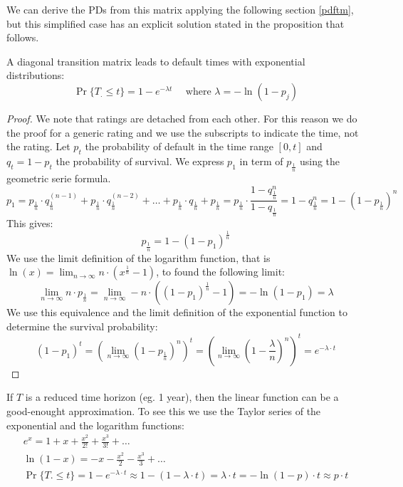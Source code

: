 \documentclass[11pt,fleqn]{book} %
\begin{document}
We can derive the PDs from this matrix applying the following 
section \ref{pdftm}, but this simplified case has an explicit
solution stated in the proposition that follows.

\begin{proposition}
	A diagonal transition matrix leads to default times with exponential
	distributions:
	\begin{displaymath}
		\Pr\{T_. \le t\} = 1 - e^{-\lambda t} 
		\quad \text{ where } \lambda = -\ln(1-p_j)
	\end{displaymath}
\end{proposition}
\begin{proof}
	We note that ratings are detached from each other. 
	For this reason we do the proof for a generic rating and we
	use the subscripts to indicate the time, not the rating.
	Let $p_t$ the probability of default in the time range $[0,t]$ and
	$q_t=1-p_t$ the probability of survival. We express $p_1$ in term
	of $p_{\frac{1}{n}}$ using the geometric serie formula.
	\begin{displaymath}
		p_1 = p_{\frac{1}{n}} \cdot q_{\frac{1}{n}}^{(n-1)} + 
			p_{\frac{1}{n}} \cdot q_{\frac{1}{n}}^{(n-2)} + \dots + 
			p_{\frac{1}{n}} \cdot q_{\frac{1}{n}} + 
			p_{\frac{1}{n}}
		= p_{\frac{1}{n}} \cdot \frac{1-q_{\frac{1}{n}}^n}{1-q_{\frac{1}{n}}}
		= 1 - q_{\frac{1}{n}}^n
		= 1- (1-p_{\frac{1}{n}})^n
	\end{displaymath}
	This gives:
	\begin{displaymath}
		p_{\frac{1}{n}} = 1-(1-p_1)^{\frac{1}{n}}
	\end{displaymath}
	We use the limit definition of the logarithm function, that is 
	$\ln(x)=\lim_{n \to \infty} n \cdot(x^{\frac{1}{n}}-1)$, to
	found the following limit:
	\begin{displaymath}
		\lim_{n \to \infty} n \cdot p_{\frac{1}{n}} = 
		\lim_{n \to \infty} -n \cdot ((1-p_1)^{\frac{1}{n}} -1) =
		-\ln(1-p_1) = \lambda
	\end{displaymath}
	We use this equivalence and the limit definition of the 
	exponential function to determine the survival probability:
	\begin{displaymath}
		(1-p_1)^t 
		= \left( \lim_{n \to \infty} (1-p_{\frac{1}{n}})^n \right)^t
		= \left(\lim_{n \to \infty} (1-\frac{\lambda}{n})^n \right)^t
		= e^{-\lambda \cdot t}
	\end{displaymath}
\end{proof}

If $T$ is a reduced time horizon (eg. 1 year), then the linear function
can be a good-enought approximation. To see this we use the Taylor series
of the exponential and the logarithm functions:
\begin{displaymath}
	\begin{array}{l}
		e^x = 1 +x + \frac{x^2}{2!} + \frac{x^3}{3!} + \dots
		\\
		\ln(1-x) = -x - \frac{x^2}{2} - \frac{x^3}{3} + \dots
		\\
		\Pr\{T. \le t\} = 1-e^{-\lambda\cdot t} \approx
		1 - (1-\lambda \cdot t) = \lambda \cdot t = 
		- \ln(1-p) \cdot t \approx p \cdot t
	\end{array}
\end{displaymath}
\end{document}
